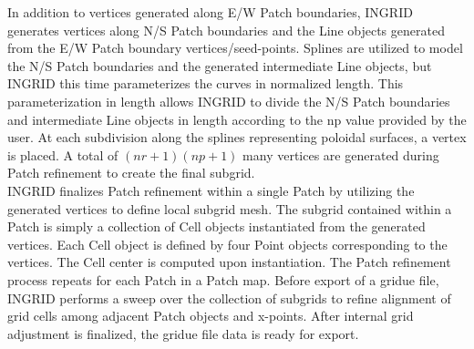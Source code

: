 In addition to vertices generated along E/W Patch boundaries, INGRID generates vertices along N/S Patch boundaries and the Line objects generated from the E/W Patch boundary vertices/seed-points. Splines are utilized to model the N/S Patch boundaries and the generated intermediate Line objects, but INGRID this time parameterizes the curves in normalized length. This parameterization in length allows INGRID to divide the N/S Patch boundaries and intermediate Line objects in length according to the np value provided by the user. At each subdivision along the splines representing poloidal surfaces, a vertex is placed. A total of $(nr+1)(np+1)$ many vertices are generated during Patch refinement to create the final subgrid.\\
INGRID finalizes Patch refinement within a single Patch by utilizing the generated vertices to define local subgrid mesh. The subgrid contained within a Patch is simply a collection of Cell objects instantiated from the generated vertices. Each Cell object is defined by four Point objects corresponding to the vertices. The Cell center is computed upon instantiation. 
The Patch refinement process repeats for each Patch in a Patch map. Before export of a gridue file, INGRID performs a sweep over the collection of subgrids to refine alignment of grid cells among adjacent Patch objects and x-points. After internal grid adjustment is finalized, the gridue file data is ready for export.